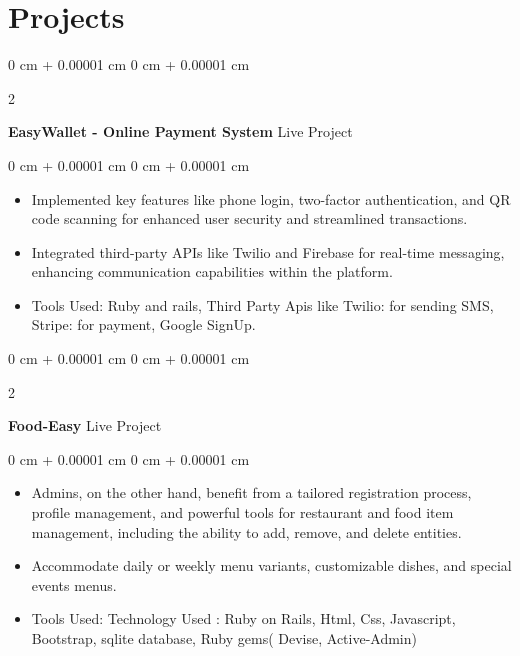 \documentclass[10pt, letterpaper]{article}
\newenvironment{highlights}{
    \begin{itemize}[
        topsep=0.10 cm,
        parsep=0.10 cm,
        partopsep=0pt,
        itemsep=0pt,
        leftmargin=0 cm + 10pt
    ]
}{
    \end{itemize}
} %
\newenvironment{onecolentry}{
    \begin{adjustwidth}{
        0 cm + 0.00001 cm
    }{
        0 cm + 0.00001 cm
    }
}{
    \end{adjustwidth}
} %
\newenvironment{twocolentry}[2][]{
    \onecolentry
    \def\secondColumn{#2}
    \setcolumnwidth{\fill, 4.5 cm}
    \begin{paracol}{2}
}{
    \switchcolumn \raggedleft \secondColumn
    \end{paracol}
    \endonecolentry
} %
\begin{document}
        
    
    
    \section{Projects}



        
        \begin{twocolentry}{
          Live Project
        }
            \textbf{EasyWallet - Online Payment System}\end{twocolentry}

        \vspace{0.10 cm}
        \begin{onecolentry}
            \begin{highlights}
                \item Implemented key features like phone login, two-factor authentication, and QR code scanning for enhanced user security and streamlined transactions.
                \item Integrated third-party APIs like Twilio and Firebase for real-time messaging, enhancing communication capabilities within the platform.
                \item Tools Used: Ruby and rails, Third Party Apis like Twilio: for sending SMS, Stripe: for payment, Google SignUp.
            \end{highlights}
        \end{onecolentry}


        \vspace{0.2 cm}

      \begin{twocolentry}{
          Live Project
        }
            \textbf{Food-Easy}\end{twocolentry}

        \vspace{0.10 cm}
        \begin{onecolentry}
            \begin{highlights}
                \item Admins, on the other hand, benefit from a tailored registration process, profile management, and powerful tools for restaurant and food item management, including the ability to add, remove, and delete entities.
                \item Accommodate daily or weekly menu variants, customizable dishes, and special events menus.
                \item Tools Used: Technology Used : Ruby on Rails, Html, Css, Javascript, Bootstrap, sqlite database, Ruby gems( Devise, Active-Admin)
            \end{highlights}
        \end{onecolentry}
\end{document}
